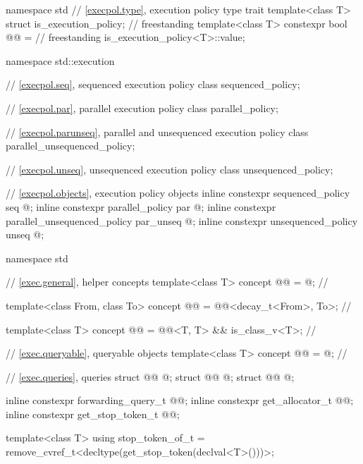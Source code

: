 %
\begin{codeblock}
namespace std {
  // \ref{execpol.type}, execution policy type trait
  template<class T> struct is_execution_policy;                 // freestanding
  template<class T> constexpr bool @@ =      // freestanding
      is_execution_policy<T>::value;
}

namespace std::execution {
  // \ref{execpol.seq}, sequenced execution policy
  class sequenced_policy;

  // \ref{execpol.par}, parallel execution policy
  class parallel_policy;

  // \ref{execpol.parunseq}, parallel and unsequenced execution policy
  class parallel_unsequenced_policy;

  // \ref{execpol.unseq}, unsequenced execution policy
  class unsequenced_policy;

  // \ref{execpol.objects}, execution policy objects
  inline constexpr sequenced_policy            seq{ @\unspec@ };
  inline constexpr parallel_policy             par{ @\unspec@ };
  inline constexpr parallel_unsequenced_policy par_unseq{ @\unspec@ };
  inline constexpr unsequenced_policy          unseq{ @\unspec@ };
}

namespace std {
  // \ref{exec.general}, helper concepts
  template<class T>
    concept @@ = @\seebelownc@;                          // \expos

  template<class From, class To>
    concept @@ = @@<decay_t<From>, To>;             // \expos

  template<class T>
    concept @@ = @@<T, T> && is_class_v<T>;      // \expos

  // \ref{exec.queryable}, queryable objects
  template<class T>
    concept @@ = @\seebelownc@;                              // \expos

  // \ref{exec.queries}, queries
  struct @@ { @\unspec@ };
  struct @@ { @\unspec@ };
  struct @@ { @\unspec@ };

  inline constexpr forwarding_query_t @@{};
  inline constexpr get_allocator_t @@{};
  inline constexpr get_stop_token_t @@{};

  template<class T>
    using stop_token_of_t = remove_cvref_t<decltype(get_stop_token(declval<T>()))>;

}
\end{codeblock}
